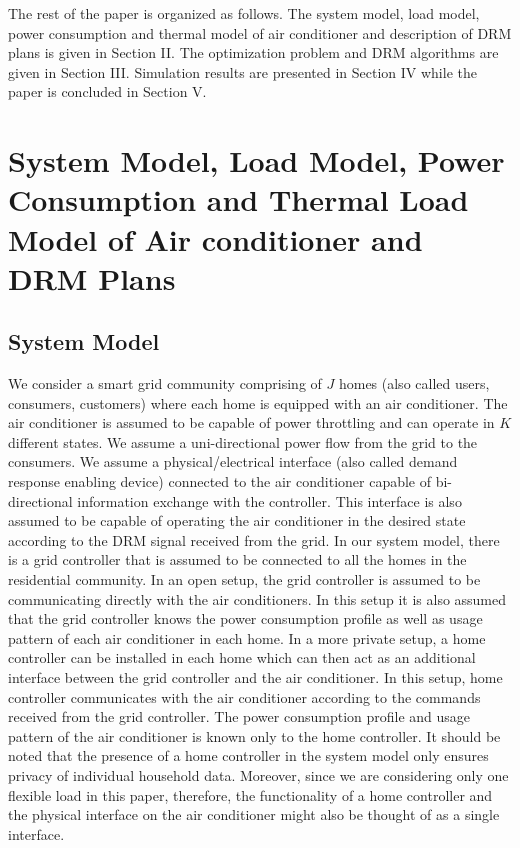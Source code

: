 \documentclass[10pt,twocolumn,twoside]{IEEEtran}
\begin{document}
The rest of the paper is organized as follows. The system model, load model, power consumption and thermal model of air conditioner and description of DRM plans is given in Section II. The optimization problem and DRM algorithms are given in Section III. Simulation results are presented in Section IV while the paper is concluded in Section V.
 
 
\section{System Model, Load Model, Power Consumption and Thermal Load Model of Air conditioner and DRM Plans}

\subsection{System Model} 
We consider a smart grid community comprising of $J$ homes (also called users, consumers, customers) where each home is equipped with an air conditioner. The air conditioner is assumed to be capable of power throttling and can operate in $K$ different states. We assume a uni-directional power flow from the grid to the consumers. We assume a physical/electrical interface (also called demand response enabling device) \cite{aus_stand} connected to the air conditioner capable of bi-directional information exchange with the controller. This interface is also assumed to be capable of operating the air conditioner in the desired state according to the DRM signal received from the grid. 
In our system model, there is a grid controller that is assumed to be connected to all the homes in the residential community. In an open setup, the grid controller is assumed to be communicating directly with the air conditioners. In this setup it is also assumed that the grid controller knows the power consumption profile as well as usage pattern of each air conditioner in each home. In a more private setup, a home controller can be installed in each home which can then act as an additional interface between the grid controller and the air conditioner. In this setup, home controller communicates with the air conditioner according to the commands received from the grid controller. The power consumption profile and usage pattern of the air conditioner is known only to the home controller. It should be noted that the presence of a home controller in the system model only ensures privacy of individual household data. Moreover, since we are considering only one flexible load in this paper, therefore, the functionality of a home controller and the physical interface on the air conditioner might also be thought of as a single interface. 
\end{document}

